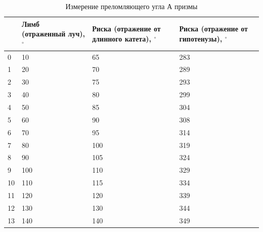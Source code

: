 \documentclass[12pt]{article}
\begin{document}
    \begin{table}[b]
        \centering
        \caption{Измерение преломляющего угла А призмы}
        \label{tab:tab1}
        \begin{tabular}{|p{0.5cm}|p{3cm}|p{4cm}|p{4cm}|}
            \hline
            {} & Лимб (отраженный луч), $^{\circ}$ & Риска (отражение от длинного катета), $^{\circ}$ & Риска (отражение от гипотенузы), $^{\circ}$ \\\hline
            0  & 10                                & 65                                               & 283                                         \\
            1  & 20                                & 70                                               & 289                                         \\
            2  & 30                                & 75                                               & 293                                         \\
            3  & 40                                & 80                                               & 299                                         \\
            4  & 50                                & 85                                               & 304                                         \\
            5  & 60                                & 90                                               & 308                                         \\
            6  & 70                                & 95                                               & 314                                         \\
            7  & 80                                & 100                                              & 319                                         \\
            8  & 90                                & 105                                              & 324                                         \\
            9  & 100                               & 110                                              & 329                                         \\
            10 & 110                               & 115                                              & 334                                         \\
            11 & 120                               & 120                                              & 339                                         \\
            12 & 130                               & 130                                              & 344                                         \\
            13 & 140                               & 140                                              & 349                                         \\\hline
        \end{tabular}
    \end{table}
\end{document}
